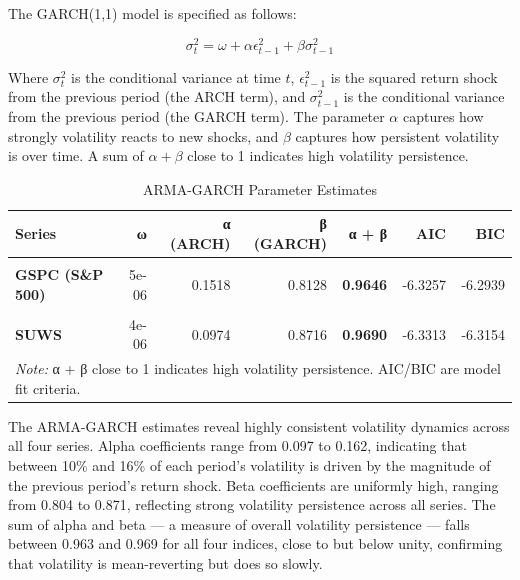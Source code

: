 \documentclass[
]{article}
\begin{document}
The GARCH(1,1) model is specified as follows:

\[\sigma^2_t = \omega + \alpha \epsilon^2_{t-1} + \beta \sigma^2_{t-1}\]

Where \(\sigma^2_t\) is the conditional variance at time \(t\),
\(\epsilon^2_{t-1}\) is the squared return shock from the previous
period (the ARCH term), and \(\sigma^2_{t-1}\) is the conditional
variance from the previous period (the GARCH term). The parameter
\(\alpha\) captures how strongly volatility reacts to new shocks, and
\(\beta\) captures how persistent volatility is over time. A sum of
\(\alpha + \beta\) close to 1 indicates high volatility persistence.

\begingroup\fontsize{10}{12}\selectfont

\begin{longtable}[t]{>{}lrrr>{}rrr}
\caption{\label{tab:garch-summary-table}ARMA-GARCH Parameter Estimates}\\
\toprule
Series & ω & α (ARCH) & β (GARCH) & α + β & AIC & BIC\\
\midrule
\textbf{\cellcolor{gray!10}{ESGU}} & \cellcolor{gray!10}{6e-06} & \cellcolor{gray!10}{0.1665} & \cellcolor{gray!10}{0.7938} & \textbf{\cellcolor{gray!10}{0.9602}} & \cellcolor{gray!10}{-6.2964} & \cellcolor{gray!10}{-6.2646}\\
\textbf{GSPC (S\&P 500)} & 5e-06 & 0.1518 & 0.8128 & \textbf{0.9646} & -6.3257 & -6.2939\\
\textbf{\cellcolor{gray!10}{IWDA}} & \cellcolor{gray!10}{4e-06} & \cellcolor{gray!10}{0.1608} & \cellcolor{gray!10}{0.8056} & \textbf{\cellcolor{gray!10}{0.9664}} & \cellcolor{gray!10}{-6.6212} & \cellcolor{gray!10}{-6.6013}\\
\textbf{SUWS} & 4e-06 & 0.0974 & 0.8716 & \textbf{0.9690} & -6.3313 & -6.3154\\
\bottomrule
\multicolumn{7}{l}{\rule{0pt}{1em}\textit{Note: } α + β close to 1 indicates high volatility persistence. AIC/BIC are model fit criteria.}\\
\end{longtable}
\endgroup{}

The ARMA-GARCH estimates reveal highly consistent volatility dynamics
across all four series. Alpha coefficients range from 0.097 to 0.162,
indicating that between 10\% and 16\% of each period's volatility is
driven by the magnitude of the previous period's return shock. Beta
coefficients are uniformly high, ranging from 0.804 to 0.871, reflecting
strong volatility persistence across all series. The sum of alpha and
beta --- a measure of overall volatility persistence --- falls between
0.963 and 0.969 for all four indices, close to but below unity,
confirming that volatility is mean-reverting but does so slowly.
\end{document}
